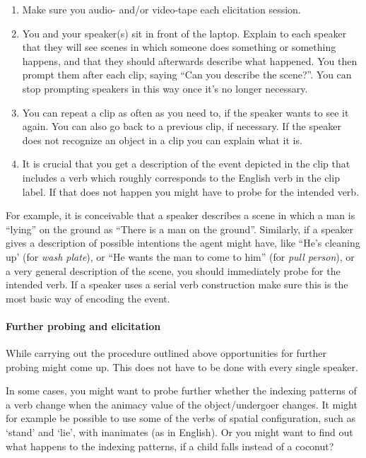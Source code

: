 \begin{enumerate}
 \item Make sure you audio- and/or video-tape each elicitation session. 
 \item  You and your speaker(s) sit in front of the laptop. Explain to each speaker that they will see scenes in which someone does something or something happens, and that they should afterwards describe what happened. You then prompt them after each clip, saying ``Can you describe the scene?''. You can stop prompting speakers in this way once it's no longer necessary.
 \item  You can repeat a clip as often as you need to, if the speaker wants to see it again. You can also go back to a previous clip, if necessary. If the speaker does not recognize an object in a clip you can explain what it is.
  \item It is crucial that you get a description of the event depicted in the clip that includes a verb which roughly corresponds to the English verb in the clip label. If that does not happen you might have to probe for the intended verb. 
\end{enumerate}


  For example, it is conceivable that a speaker describes a scene in which a man is ``lying'' on the ground as ``There is a man on the ground''. Similarly, if a speaker gives a description of possible intentions the agent might have, like ``He's cleaning up' (for \textit{wash plate}), or ``He wants the man to come to him'' (for \textit{pull person}), or a very general description of the scene, you should immediately probe for the intended verb. If a speaker uses a serial verb construction make sure this is the most basic way of encoding the event.

\paragraph{Further probing and elicitation}

While carrying out the procedure outlined above opportunities for further probing might come up. This does not have to be done with every single speaker. 

  In some cases, you might want to probe further whether the indexing patterns of a verb change when the animacy value of the object/undergoer changes. It might for example be possible to use some of the verbs of spatial configuration, such as `stand' and `lie', with inanimates (as in English). Or you might want to find out what happens to the indexing patterns, if a child falls instead of a coconut?

